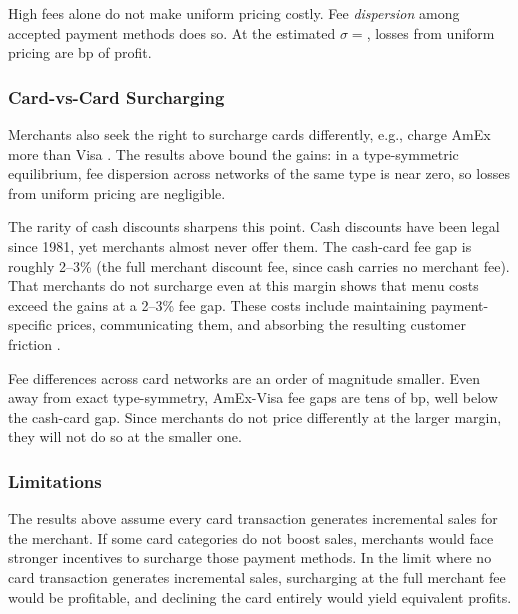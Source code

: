 \documentclass[main.tex]{subfiles}
\begin{document}
High fees alone do not make uniform pricing costly. Fee \emph{dispersion} among accepted payment methods does so.
At the estimated $\sigma=$, losses from uniform pricing are  bp of profit.

\subsubsection{Card-vs-Card Surcharging}
\label{subsubsec:oa-surcharge-card-vs-card}

Merchants also seek the right to surcharge cards differently, e.g., charge AmEx more than Visa \parencite{Conrath2014}.
The results above bound the gains: in a type-symmetric equilibrium, fee dispersion across networks of the same type is near zero, so losses from uniform pricing are negligible.

The rarity of cash discounts sharpens this point.
Cash discounts have been legal since 1981, yet merchants almost never offer them.
The cash-card fee gap is roughly 2--3\% (the full merchant discount fee, since cash carries no merchant fee).
That merchants do not surcharge even at this margin shows that menu costs exceed the gains at a 2--3\% fee gap. These costs include maintaining payment-specific prices, communicating them, and absorbing the resulting customer friction \parencite{Caddy.etal2020}.

Fee differences across card networks are an order of magnitude smaller.
Even away from exact type-symmetry, AmEx-Visa fee gaps are tens of bp, well below the cash-card gap.
Since merchants do not price differently at the larger margin, they will not do so at the smaller one.

\subsubsection{Limitations}
\label{subsubsec:surcharge-effective}

The results above assume every card transaction generates incremental sales for the merchant.
If some card categories do not boost sales, merchants would face stronger incentives to surcharge those payment methods.
In the limit where no card transaction generates incremental sales, surcharging at the full merchant fee would be profitable, and declining the card entirely would yield equivalent profits.
\end{document}

